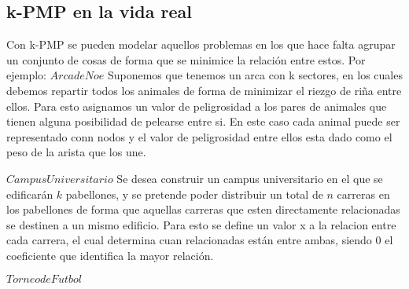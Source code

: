\subsection{k-PMP en la vida real}

Con k-PMP se pueden modelar aquellos problemas en los que hace falta agrupar un conjunto de cosas de forma que se minimice la relación entre estos.
Por ejemplo:
$Arca de Noe$
Suponemos que tenemos un arca con k sectores, en los cuales debemos repartir todos los animales de forma de minimizar el riezgo de riña entre ellos. Para esto asignamos un valor de peligrosidad a los pares de animales que tienen alguna posibilidad de pelearse entre si. En este caso cada animal puede ser representado conn nodos y el valor de peligrosidad entre ellos esta dado como el peso de la arista que los une.

$Campus Universitario$
Se desea construir un campus universitario en el que se edificarán $k$ pabellones, y se pretende poder distribuir un total de $n$ carreras en los pabellones de forma que aquellas carreras que esten directamente relacionadas se destinen a un mismo edificio. Para esto se define un valor x a la relacion entre cada carrera, el cual determina cuan relacionadas están entre ambas, siendo 0 el coeficiente que identifica la mayor relación. 


$Torneo de Futbol$
